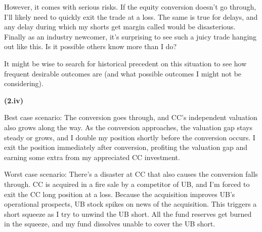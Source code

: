 \documentclass[11pt]{article}
\begin{document}
However, it comes with serious risks. If the equity conversion doesn't go through, I'll likely need to quickly exit the trade at a loss. The same is true for delays, and any delay during which my shorts get margin called would be disasterious. Finally as an industry newcomer, it's surprising to see such a juicy trade hanging out like this. Is it possible others know more than I do? 

It might be wise to search for historical precedent on this situation to see how frequent desirable outcomes are (and what possible outcomes I might not be considering).

\textbf{(2.iv)}

Best case scenario: The conversion goes through, and CC's independent valuation also grows along the way. As the conversion approaches, the valuation gap stays steady or grows, and I double my position shortly before the conversion occurs. I exit the position immediately after conversion, profiting the valuation gap and earning some extra from my appreciated CC investment. 

Worst case scenario: There's a disaster at CC that also causes the conversion falls through. CC is acquired in a fire sale by a competitor of UB, and I'm forced to exit the CC long position at a loss. Because the acquisition improves UB's operational prospects, UB stock spikes on news of the acquisition. This triggers a short squeeze as I try to unwind the UB short. All the fund reserves get burned in the squeeze, and my fund dissolves unable to cover the UB short.  
\end{document}
